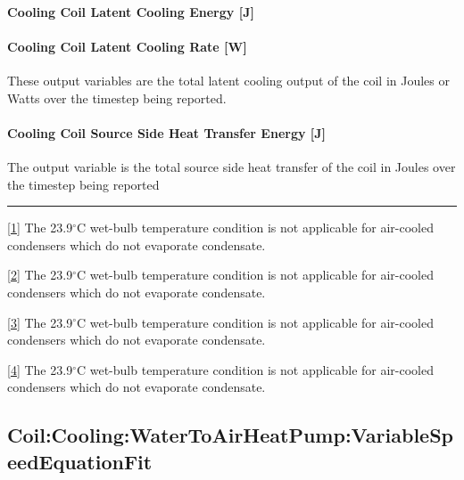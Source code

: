 \paragraph{Cooling Coil Latent Cooling Energy {[}J{]}}\label{cooling-coil-latent-cooling-energy-j-6}

\paragraph{Cooling Coil Latent Cooling Rate {[}W{]}}\label{cooling-coil-latent-cooling-rate-w-4}

These output variables are the total latent cooling output of the coil in Joules or Watts over the timestep being reported.

\paragraph{Cooling Coil Source Side Heat Transfer Energy {[}J{]}}\label{cooling-coil-source-side-heat-transfer-energy-j-3}

The output variable is the total source side heat transfer of the coil in Joules over the timestep being reported

\begin{center}\rule{0.5\linewidth}{0.4pt}\end{center}

\protect\hyperlink{ux5fftnref1}{{[}1{]}} The 23.9$^\circ$C wet-bulb temperature condition is not applicable for air-cooled condensers which do not evaporate condensate.

\protect\hyperlink{ux5fftnref2}{{[}2{]}} The 23.9$^\circ$C wet-bulb temperature condition is not applicable for air-cooled condensers which do not evaporate condensate.

\protect\hyperlink{ux5fftnref3}{{[}3{]}} The 23.9$^\circ$C wet-bulb temperature condition is not applicable for air-cooled condensers which do not evaporate condensate.

\protect\hyperlink{ux5fftnref4}{{[}4{]}} The 23.9$^\circ$C wet-bulb temperature condition is not applicable for air-cooled condensers which do not evaporate condensate.

\subsection{Coil:Cooling:WaterToAirHeatPump:VariableSpeedEquationFit}\label{coilcoolingwatertoairheatpumpvariablespeedequationfit}


